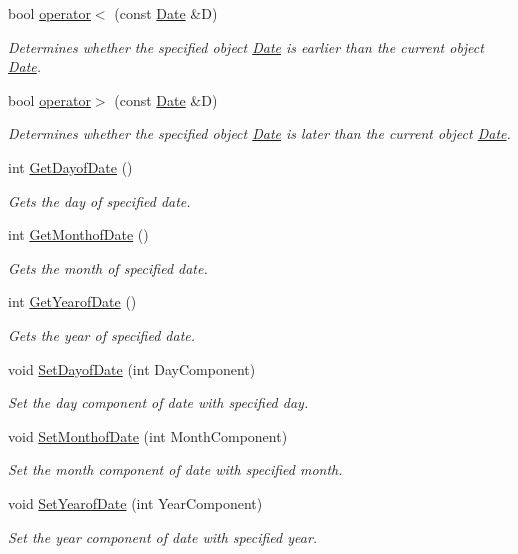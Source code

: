 \begin{DoxyCompactItemize}
bool \hyperlink{class_date_afb88829e04e94bbedb058aacfe6c9ab7}{operator$<$} (const \hyperlink{class_date}{Date} \&D)
\begin{DoxyCompactList}\small\item\em Determines whether the specified object \hyperlink{class_date}{Date} is earlier than the current object \hyperlink{class_date}{Date}. \end{DoxyCompactList}\item 
bool \hyperlink{class_date_a6e4731c11f54e00166edeb97b7e54037}{operator$>$} (const \hyperlink{class_date}{Date} \&D)
\begin{DoxyCompactList}\small\item\em Determines whether the specified object \hyperlink{class_date}{Date} is later than the current object \hyperlink{class_date}{Date}. \end{DoxyCompactList}\item 
int \hyperlink{class_date_a3015dcbb857b2182a59177f3a277b3eb}{Get\-Dayof\-Date} ()
\begin{DoxyCompactList}\small\item\em Gets the day of specified date. \end{DoxyCompactList}\item 
int \hyperlink{class_date_ae9828bcfdd9e4bd18b8b356069249f31}{Get\-Monthof\-Date} ()
\begin{DoxyCompactList}\small\item\em Gets the month of specified date. \end{DoxyCompactList}\item 
int \hyperlink{class_date_a1194e01502a0267cb0494ee8a7a1b649}{Get\-Yearof\-Date} ()
\begin{DoxyCompactList}\small\item\em Gets the year of specified date. \end{DoxyCompactList}\item 
void \hyperlink{class_date_aa5ac806a5d140c3eb60e489f39b6ecdf}{Set\-Dayof\-Date} (int Day\-Component)
\begin{DoxyCompactList}\small\item\em Set the day component of date with specified day. \end{DoxyCompactList}\item 
void \hyperlink{class_date_a5c6fd52c67e4f09558fcbd788ed6fa55}{Set\-Monthof\-Date} (int Month\-Component)
\begin{DoxyCompactList}\small\item\em Set the month component of date with specified month. \end{DoxyCompactList}\item 
void \hyperlink{class_date_a717961f3e2938f4b7e7523335b899cd6}{Set\-Yearof\-Date} (int Year\-Component)
\begin{DoxyCompactList}\small\item\em Set the year component of date with specified year. \end{DoxyCompactList}\end{DoxyCompactItemize}
